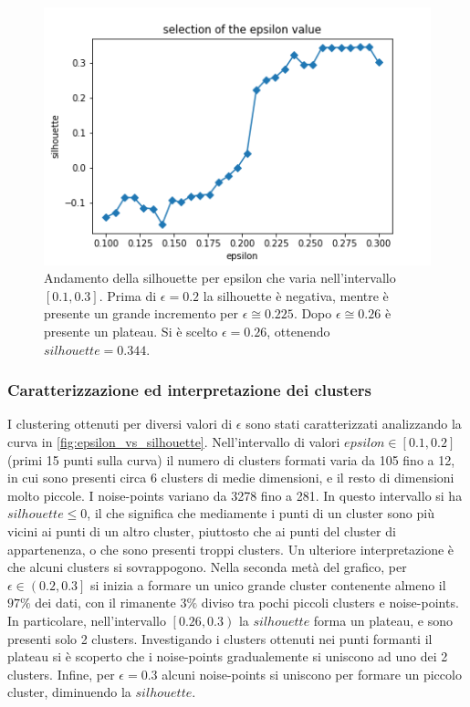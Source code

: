 \documentclass[10pt,a4paper,twocolumn]{article}
\begin{document}
\begin{figure}[hbtp]
\centering
\includegraphics[width=1\columnwidth]{../images/epsilon_vs_silhouette.png}
\caption{Andamento della silhouette per epsilon che varia nell'intervallo $\left[0.1,0.3\right]$. Prima di $\epsilon=0.2$ la silhouette è negativa, mentre è presente un grande incremento per $\epsilon \cong 0.225$. Dopo $\epsilon \cong 0.26$ è presente un plateau. Si è scelto $\epsilon = 0.26$, ottenendo $silhouette=0.344$.}
\label{fig:epsilon_vs_silhouette}
\end{figure}

\subsubsection{Caratterizzazione ed interpretazione dei clusters}
I clustering ottenuti per diversi valori di $\epsilon$ sono stati caratterizzati analizzando la curva in  \autoref{fig:epsilon_vs_silhouette}.
Nell'intervallo di valori $epsilon \in \left[0.1, 0.2\right]$ (primi 15 punti sulla curva) il numero di clusters formati varia da 105 fino a 12, in cui sono presenti circa 6 clusters di medie dimensioni, e il resto di dimensioni molto piccole. I noise-points variano da 3278 fino a 281. In questo intervallo si ha $silhouette \leq 0$, il che significa che mediamente i punti di un cluster sono più vicini ai punti di un altro cluster, piuttosto che ai punti del cluster di appartenenza, o che sono presenti troppi clusters. Un ulteriore interpretazione è che alcuni clusters si sovrappogono.
Nella seconda metà del grafico, per $\epsilon \in \left(0.2, 0.3\right]$ si inizia a formare un unico grande cluster contenente almeno il $97\%$ dei dati, con il rimanente $3\%$ diviso tra pochi piccoli clusters e noise-points. 
In particolare, nell'intervallo $\left[0.26, 0.3\right)$ la $silhouette$ forma un plateau, e sono presenti solo 2 clusters. 
Investigando i clusters ottenuti nei punti formanti il plateau si è scoperto che i noise-points gradualemente si uniscono ad uno dei 2 clusters.
Infine, per $\epsilon=0.3$ alcuni noise-points si uniscono per formare un piccolo cluster, diminuendo la $silhouette$.
\end{document}
